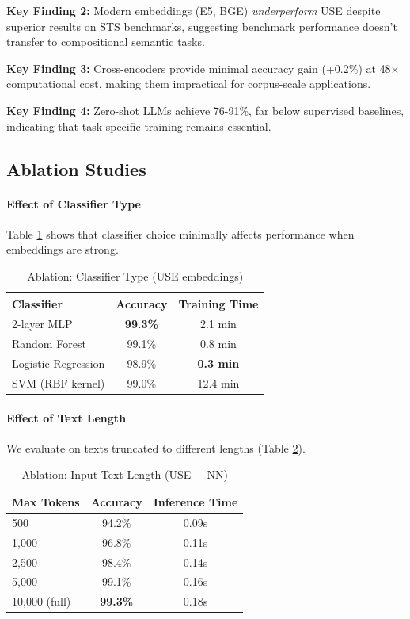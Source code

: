 \documentclass[11pt,a4paper]{article}
\begin{document}
\textbf{Key Finding 2:} Modern embeddings (E5, BGE) \textit{underperform} USE despite superior results on STS benchmarks, suggesting benchmark performance doesn't transfer to compositional semantic tasks.

\textbf{Key Finding 3:} Cross-encoders provide minimal accuracy gain (+0.2\%) at 48× computational cost, making them impractical for corpus-scale applications.

\textbf{Key Finding 4:} Zero-shot LLMs achieve 76-91\%, far below supervised baselines, indicating that task-specific training remains essential.

\subsection{Ablation Studies}

\paragraph{Effect of Classifier Type}
Table \ref{tab:ablation_classifier} shows that classifier choice minimally affects performance when embeddings are strong.

\begin{table}[h]
\centering
\small
\caption{Ablation: Classifier Type (USE embeddings)}
\label{tab:ablation_classifier}
\begin{tabular}{lcc}
\toprule
\textbf{Classifier} & \textbf{Accuracy} & \textbf{Training Time} \\
\midrule
2-layer MLP & \textbf{99.3\%} & 2.1 min \\
Random Forest & 99.1\% & 0.8 min \\
Logistic Regression & 98.9\% & \textbf{0.3 min} \\
SVM (RBF kernel) & 99.0\% & 12.4 min \\
\bottomrule
\end{tabular}
\end{table}

\paragraph{Effect of Text Length}
We evaluate on texts truncated to different lengths (Table \ref{tab:ablation_length}).

\begin{table}[h]
\centering
\small
\caption{Ablation: Input Text Length (USE + NN)}
\label{tab:ablation_length}
\begin{tabular}{lcc}
\toprule
\textbf{Max Tokens} & \textbf{Accuracy} & \textbf{Inference Time} \\
\midrule
500 & 94.2\% & 0.09s \\
1,000 & 96.8\% & 0.11s \\
2,500 & 98.4\% & 0.14s \\
5,000 & 99.1\% & 0.16s \\
10,000 (full) & \textbf{99.3\%} & 0.18s \\
\bottomrule
\end{tabular}
\end{table}
\end{document}
